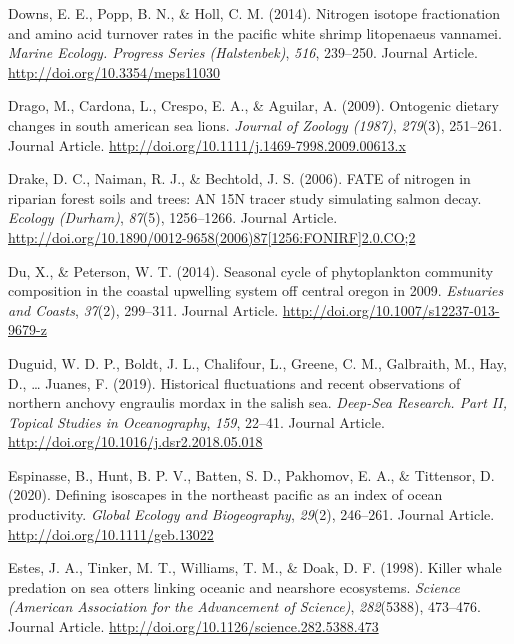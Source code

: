 \documentclass [11pt, proquest] {uwthesis}[2015/03/03]
\begin{document}
\hypertarget{ref-Downs2014}{}
Downs, E. E., Popp, B. N., \& Holl, C. M. (2014). Nitrogen isotope
fractionation and amino acid turnover rates in the pacific white shrimp
litopenaeus vannamei. \emph{Marine Ecology. Progress Series
(Halstenbek)}, \emph{516}, 239--250. Journal Article.
\url{http://doi.org/10.3354/meps11030}

\hypertarget{ref-Drago2009}{}
Drago, M., Cardona, L., Crespo, E. A., \& Aguilar, A. (2009). Ontogenic
dietary changes in south american sea lions. \emph{Journal of Zoology
(1987)}, \emph{279}(3), 251--261. Journal Article.
\url{http://doi.org/10.1111/j.1469-7998.2009.00613.x}

\hypertarget{ref-Drake2006}{}
Drake, D. C., Naiman, R. J., \& Bechtold, J. S. (2006). FATE of nitrogen
in riparian forest soils and trees: AN 15N tracer study simulating
salmon decay. \emph{Ecology (Durham)}, \emph{87}(5), 1256--1266. Journal
Article.
\href{http://doi.org/10.1890/0012-9658(2006)87\%5B1256:FONIRF\%5D2.0.CO;2}{http://doi.org/10.1890/0012-9658(2006)87{[}1256:FONIRF{]}2.0.CO;2}

\hypertarget{ref-Du2014}{}
Du, X., \& Peterson, W. T. (2014). Seasonal cycle of phytoplankton
community composition in the coastal upwelling system off central oregon
in 2009. \emph{Estuaries and Coasts}, \emph{37}(2), 299--311. Journal
Article. \url{http://doi.org/10.1007/s12237-013-9679-z}

\hypertarget{ref-Duguid2019}{}
Duguid, W. D. P., Boldt, J. L., Chalifour, L., Greene, C. M., Galbraith,
M., Hay, D., \ldots{} Juanes, F. (2019). Historical fluctuations and
recent observations of northern anchovy engraulis mordax in the salish
sea. \emph{Deep-Sea Research. Part II, Topical Studies in Oceanography},
\emph{159}, 22--41. Journal Article.
\url{http://doi.org/10.1016/j.dsr2.2018.05.018}

\hypertarget{ref-Espinasse2020}{}
Espinasse, B., Hunt, B. P. V., Batten, S. D., Pakhomov, E. A., \&
Tittensor, D. (2020). Defining isoscapes in the northeast pacific as an
index of ocean productivity. \emph{Global Ecology and Biogeography},
\emph{29}(2), 246--261. Journal Article.
\url{http://doi.org/10.1111/geb.13022}

\hypertarget{ref-Estes1998}{}
Estes, J. A., Tinker, M. T., Williams, T. M., \& Doak, D. F. (1998).
Killer whale predation on sea otters linking oceanic and nearshore
ecosystems. \emph{Science (American Association for the Advancement of
Science)}, \emph{282}(5388), 473--476. Journal Article.
\url{http://doi.org/10.1126/science.282.5388.473}
\end{document}
